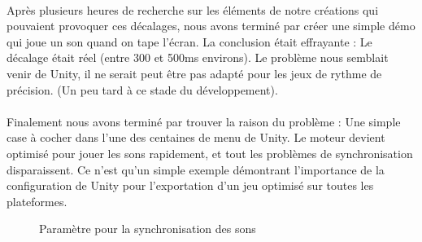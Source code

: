 \paragraph{}
Après plusieurs heures de recherche sur les éléments de notre créations qui pouvaient provoquer ces décalages, nous avons terminé par créer une simple démo qui joue un son quand on tape l'écran. La conclusion était effrayante : Le décalage était réel (entre 300 et 500ms environs). Le problème nous semblait venir de Unity, il ne serait peut être pas adapté pour les jeux de rythme de précision. (Un peu tard à ce stade du développement).

\paragraph{}
Finalement nous avons terminé par trouver la raison du problème : Une simple case à cocher dans l'une des centaines de menu de Unity. Le moteur devient optimisé pour jouer les sons rapidement, et tout les problèmes de synchronisation disparaissent. Ce n'est qu'un simple exemple démontrant l'importance de la configuration de Unity pour l'exportation d'un jeu optimisé sur toutes les plateformes.

\begin{figure}[H]\centering
  \caption{Paramètre pour la synchronisation des sons}
  \label{transitions_scenes}
\end{figure}



